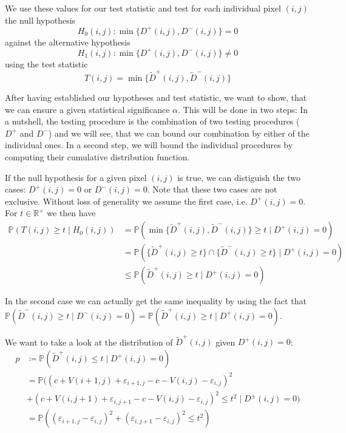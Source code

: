 \documentclass[a4paper,12pt]{article}
\theoremstyle{plain}
\theoremstyle{definition}
\theoremstyle{remark}
\begin{document}
We use these values for our test statistic and test for each individual pixel $(i, j)$ the null hypothesis
\begin{equation}
	H_0(i, j): \min \{ D^+(i, j), D^-(i, j) \} = 0
\end{equation}
against the alternative hypothesis
\begin{equation}
	H_1(i, j): \min \{ D^+(i, j), D^-(i, j) \} \neq 0
\end{equation}
using the test statistic
\begin{equation}
	T(i, j) = \min \{ \tilde{D}^+(i, j), \tilde{D}^-(i, j) \}
\end{equation}

\newpage

After having established our hypotheses and test statistic, we want to show, that we can ensure a given statistical significance $\alpha$. This will be done in two steps: In a nutshell, the testing procedure is the combination of two testing procedures ($D^+$ and $D^-$) and we will see, that we can bound our combination by either of the individual ones. In a second step, we will bound the individual procedures by computing their cumulative distribution function.

If the null hypothesis for a given pixel $(i, j)$ is true, we can distiguish the two cases: $D^+(i, j) = 0$ or $D^-(i, j) = 0$. Note that these two cases are not exclusive. Without loss of generality we assume the first case, i.e. $D^+(i, j) = 0$. For $t \in \mathbb{R}^+$ we then have
\begin{equation}\label{typeIbound}
	\begin{aligned}
		\mathbb{P}(T(i, j) \geq t \mid H_0(i, j)) &= \mathbb{P}(\min \{ \tilde{D}^+(i, j), \tilde{D}^-(i, j) \} \geq t \mid D^+(i, j) = 0) \\
		&= \mathbb{P}(\{ \tilde{D}^+(i, j) \geq t \} \cap \{ \tilde{D}^-(i, j) \geq t \} \mid D^+(i, j) = 0) \\
		&\leq \mathbb{P}(\tilde{D}^+(i, j) \geq t \mid D^+(i, j) = 0)
	\end{aligned}
\end{equation}

In the second case we can actually get the same inequality by using the fact that $\mathbb{P}(\tilde{D}^-(i, j) \geq t \mid D^-(i, j) = 0) = \mathbb{P}(\tilde{D}^+(i, j) \geq t \mid D^+(i, j) = 0)$.

We want to take a look at the distribution of $\tilde{D}^+(i, j)$ given $D^+(i, j) = 0$:
\begin{equation}
	\begin{aligned}
		p &\coloneqq \mathbb{P}(\tilde{D}^+(i, j) \leq t \mid D^+(i, j) = 0) \\
		&= \mathbb{P}( (c + V(i + 1, j) + \varepsilon_{i + 1, j} - c - V(i, j) - \varepsilon_{i, j})^2 \\
		&+ (c + V(i, j + 1) + \varepsilon_{i, j + 1} - c - V(i, j) - \varepsilon_{i, j})^2 \leq t^2 \mid D^\pm(i, j) = 0) \\
		&= \mathbb{P}\left( (\varepsilon_{i + 1, j} - \varepsilon_{i, j})^2 + (\varepsilon_{i, j + 1} - \varepsilon_{i, j})^2 \leq t^2 \right)
	\end{aligned}
\end{equation}
\end{document}
